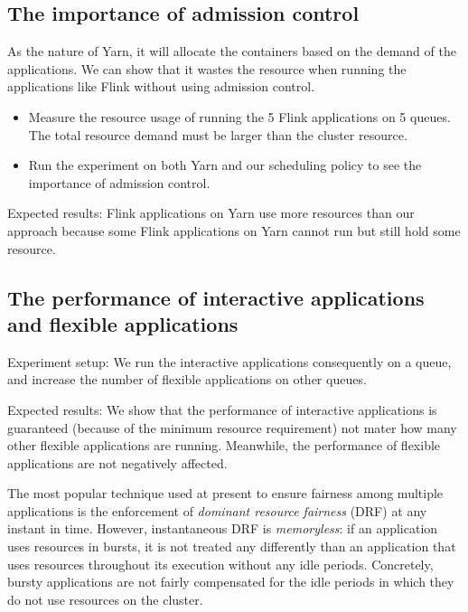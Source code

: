 

\subsection{The importance of admission control}

As the nature of Yarn, it will allocate the containers based on the demand of the applications. We can show that it wastes the resource when running the applications like Flink without using admission control.

\begin{itemize}
	\item Measure the resource usage of running the 5 Flink applications on 5 queues. The total resource demand must be larger than the cluster resource.
	\item Run the experiment on both Yarn and our scheduling policy to see the importance of admission control.
\end{itemize}

Expected results: Flink applications on Yarn use more resources than our approach because some Flink applications on Yarn cannot run but still hold some resource.

\subsection{The performance of interactive applications and flexible applications}

Experiment setup: We run the interactive applications consequently on a queue, and increase the number of flexible applications on other queues.

Expected results: We show that the performance of interactive applications is guaranteed (because of the minimum resource requirement) not mater how many other flexible applications are running. Meanwhile, the performance of flexible applications are not negatively affected.

The most popular technique used at present to ensure fairness among
multiple applications is the enforcement of \textit{dominant resource fairness} (DRF) \cite{drf} at any instant in time. However, instantaneous DRF is
\textit{memoryless}: if an application uses resources in bursts,
it is not treated any differently than an application that uses
resources throughout its execution without any idle periods. Concretely,
bursty applications are not fairly compensated for the idle periods in
which they do not use resources on the cluster.

